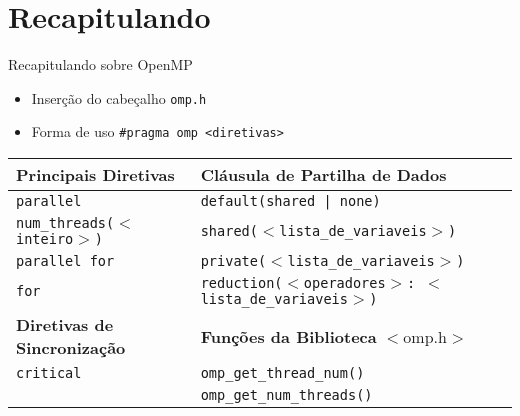 \section{Recapitulando}
	\begin{frame}[fragile]{Recapitulando sobre OpenMP}
		\begin{itemize}
			\item Inserção do cabeçalho {\tt omp.h}
			\item Forma de uso \texttt{#pragma omp <diretivas>}
		\end{itemize}
				\pause
		\begin{table}
		    \begin{tabular}{l|l}
		    \hline
		    \textbf{Principais Diretivas}           & \textbf{Cláusula de Partilha de Dados}                             \\ \hline
		    {\tt parallel                } & {\tt default(shared | none)                              } \\
		    {\tt num\_threads($<$inteiro$>$)} & {\tt shared($<$lista\_de\_variaveis$>$)                  } \\
		    {\tt parallel for            } & {\tt private($<$lista\_de\_variaveis$>$)                 } \\
		    {\tt for                     } & {\tt reduction($<$operadores$>$: $<$lista\_de\_variaveis$>$)} \\ \hline \hline

		   \textbf{ Diretivas de Sincronização}     & \textbf{Funções da Biblioteca} $<$omp.h$>$   \\ \hline

			{\tt critical                } & {\tt omp\_get\_thread\_num()      } \\
			{\tt ~                       } & {\tt omp\_get\_num\_threads()     } \\ \hline
		    \end{tabular}
		\end{table}
\end{frame}

